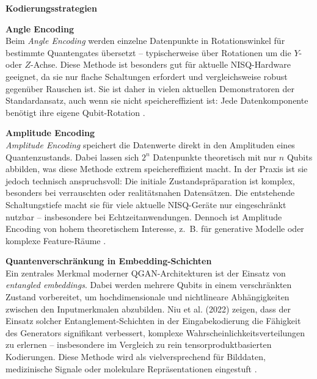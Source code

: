 \vspace{0.3cm}
\noindent
\textbf{Kodierungsstrategien}  

\vspace{0.2cm}
\noindent
\textbf{Angle Encoding}\\
Beim \textit{Angle Encoding} werden einzelne Datenpunkte in Rotationswinkel für bestimmte Quantengates übersetzt – typischerweise über Rotationen um die $Y$- oder $Z$-Achse. Diese Methode ist besonders gut für aktuelle NISQ-Hardware geeignet, da sie nur flache Schaltungen erfordert und vergleichsweise robust gegenüber Rauschen ist. Sie ist daher in vielen aktuellen Demonstratoren der Standardansatz, auch wenn sie nicht speichereffizient ist: Jede Datenkomponente benötigt ihre eigene Qubit-Rotation \cite{schuld2018, bsi2025}.  

\vspace{0.2cm}
\noindent
\textbf{Amplitude Encoding}\\
\textit{Amplitude Encoding} speichert die Datenwerte direkt in den Amplituden eines Quantenzustands. Dabei lassen sich $2^n$ Datenpunkte theoretisch mit nur $n$ Qubits abbilden, was diese Methode extrem speichereffizient macht. In der Praxis ist sie jedoch technisch anspruchsvoll: Die initiale Zustandspräparation ist komplex, besonders bei verrauschten oder realitätsnahen Datensätzen. Die entstehende Schaltungstiefe macht sie für viele aktuelle NISQ-Geräte nur eingeschränkt nutzbar – insbesondere bei Echtzeitanwendungen. Dennoch ist Amplitude Encoding von hohem theoretischem Interesse, z.~B. für generative Modelle oder komplexe Feature-Räume \cite{schuld2018, zoufal2019}.  

\vspace{0.2cm}
\noindent
\textbf{Quantenverschränkung in Embedding-Schichten}\\
Ein zentrales Merkmal moderner QGAN-Architekturen ist der Einsatz von \textit{entangled embeddings}. Dabei werden mehrere Qubits in einem verschränkten Zustand vorbereitet, um hochdimensionale und nichtlineare Abhängigkeiten zwischen den Inputmerkmalen abzubilden. Niu et al. (2022) zeigen, dass der Einsatz solcher Entanglement-Schichten in der Eingabekodierung die Fähigkeit des Generators signifikant verbessert, komplexe Wahrscheinlichkeitsverteilungen zu erlernen – insbesondere im Vergleich zu rein tensorproduktbasierten Kodierungen. Diese Methode wird als vielversprechend für Bilddaten, medizinische Signale oder molekulare Repräsentationen eingestuft \cite{niu2022}.  

\vspace{0.5cm}

